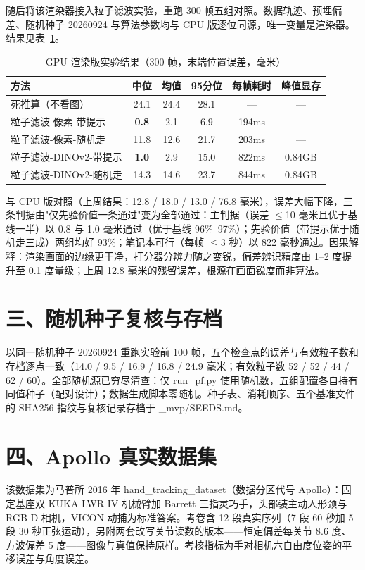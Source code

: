 \documentclass{article}
\begin{document}
随后将该渲染器接入粒子滤波实验，重跑 300 帧五组对照。数据轨迹、预埋偏差、随机种子 20260924 与算法参数均与 CPU 版逐位同源，唯一变量是渲染器。结果见表~\ref{tab:gpu}。

\begin{table}[h]\centering
\caption{GPU 渲染版实验结果（300 帧，末端位置误差，毫米）}
\label{tab:gpu}
\begin{tabular}{lccccc}
\toprule
方法 & 中位 & 均值 & 95分位 & 每帧耗时 & 峰值显存 \\
\midrule
死推算（不看图） & 24.1 & 24.4 & 28.1 & --- & --- \\
粒子滤波-像素-带提示 & \textbf{0.8} & 2.1 & 6.9 & 194ms & --- \\
粒子滤波-像素-随机走 & 11.8 & 12.6 & 21.7 & 203ms & --- \\
粒子滤波-DINOv2-带提示 & \textbf{1.0} & 2.9 & 15.0 & 822ms & 0.84GB \\
粒子滤波-DINOv2-随机走 & 14.3 & 14.6 & 23.7 & 844ms & 0.84GB \\
\bottomrule
\end{tabular}
\end{table}

与 CPU 版对照（上周结果：12.8 / 18.0 / 13.0 / 76.8 毫米），误差大幅下降，三条判据由"仅先验价值一条通过"变为全部通过：主判据（误差 $\leq$10 毫米且优于基线一半）以 0.8 与 1.0 毫米通过（优于基线 96\%--97\%）；先验价值（带提示优于随机走三成）两组均好 93\%；笔记本可行（每帧 $\leq$3 秒）以 822 毫秒通过。因果解释：渲染画面的边缘更干净，打分器分辨力随之变锐，偏差辨识精度由 1--2 度提升至 0.1 度量级；上周 12.8 毫米的残留误差，根源在画面锐度而非算法。

\section{三、随机种子复核与存档}
以同一随机种子 20260924 重跑实验前 100 帧，五个检查点的误差与有效粒子数和存档逐点一致（14.0 / 9.5 / 16.9 / 16.8 / 24.9 毫米；有效粒子数 52 / 52 / 44 / 62 / 60）。全部随机源已穷尽清查：仅 run\_pf.py 使用随机数，五组配置各自持有同值种子（配对设计）；数据生成脚本零随机。种子表、消耗顺序、五个基准文件的 SHA256 指纹与复核记录存档于 \_mvp/SEEDS.md。

\section{四、Apollo 真实数据集}
该数据集为马普所 2016 年 hand\_tracking\_dataset（数据分区代号 Apollo）：固定基座双 KUKA LWR IV 机械臂加 Barrett 三指灵巧手，头部装主动人形颈与 RGB-D 相机，VICON 动捕为标准答案。考卷含 12 段真实序列（7 段 60 秒加 5 段 30 秒正弦运动），另附两套改写关节读数的版本——恒定偏差每关节 8.6 度、方波偏差 5 度——图像与真值保持原样。考核指标为手对相机六自由度位姿的平移误差与角度误差。
\end{document}
